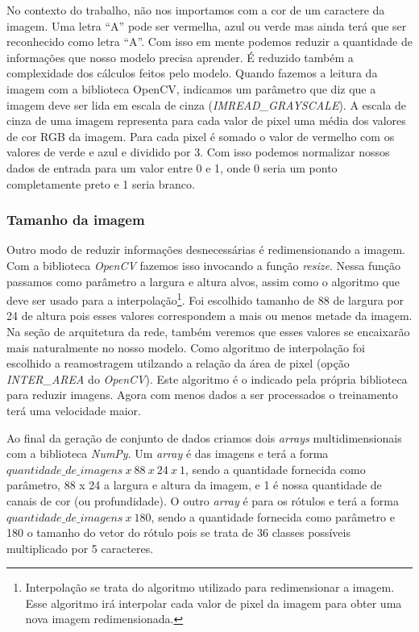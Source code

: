 No contexto do trabalho, não nos importamos com a cor de um caractere
da imagem. Uma letra ``A'' pode ser vermelha, azul ou verde mas ainda
terá que ser reconhecido como letra ``A''. Com isso em mente podemos
reduzir a quantidade de informações que nosso modelo precisa
aprender. É reduzido também a complexidade dos cálculos feitos pelo
modelo. Quando fazemos a leitura da imagem com a biblioteca OpenCV,
indicamos um parâmetro que diz que a imagem deve ser lida em escala de
cinza (\textit{IMREAD\_GRAYSCALE}). A escala de cinza de uma imagem
representa para cada valor de pixel uma média dos valores de cor RGB
da imagem. Para cada pixel é somado o valor de vermelho com os valores
de verde e azul e dividido por 3. Com isso podemos normalizar nossos
dados de entrada para um valor entre 0 e 1, onde 0 seria um ponto
completamente preto e 1 seria branco.

\subsubsection{Tamanho da imagem}

Outro modo de reduzir informações desnecessárias é redimensionando a
imagem. Com a biblioteca \textit{OpenCV} fazemos isso invocando a
função \textit{resize}. Nessa função passamos como parâmetro a largura
e altura alvos, assim como o algoritmo que deve ser usado para a
interpolação\footnote{Interpolação se trata do algoritmo utilizado
  para redimensionar a imagem. Esse algoritmo irá interpolar cada
  valor de pixel da imagem para obter uma nova imagem
  redimensionada.}. Foi escolhido tamanho de 88 de largura por 24 de
altura pois esses valores correspondem a mais ou menos metade da
imagem. Na seção de arquitetura da rede, também veremos que esses
valores se encaixarão mais naturalmente no nosso modelo. Como
algoritmo de interpolação foi escolhido a reamostragem utilzando a
relação da área de pixel (opção \textit{INTER\_AREA} do
\textit{OpenCV}). Este algoritmo é o indicado pela própria biblioteca
para reduzir imagens. Agora com menos dados a ser processados o
treinamento terá uma velocidade maior.

Ao final da geração de conjunto de dados criamos dois \textit{arrays}
multidimensionais com a biblioteca \textit{NumPy}. Um \textit{array} é das
imagens e terá a forma $quantidade\_de\_imagens\ x\ 88\ x\ 24\ x\ 1$,
sendo a quantidade fornecida como parâmetro, 88 x 24 a largura e
altura da imagem, e 1 é nossa quantidade de canais de cor (ou
profundidade). O outro \textit{array} é para os rótulos e terá a forma
$quantidade\_de\_imagens\ x\ 180$, sendo a quantidade fornecida como
parâmetro e 180 o tamanho do vetor do rótulo pois se trata de 36
classes possíveis multiplicado por 5 caracteres.

